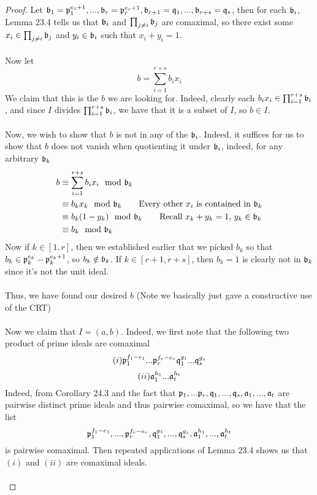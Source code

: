\begin{proof}
Let $\mathfrak{b}_1 = \mathfrak{p}_1^{e_1 + 1}, ..., \mathfrak{b}_r = \mathfrak{p}_r^{e_r + 1}, \mathfrak{b}_{r+1} = \mathfrak{q}_1, ..., \mathfrak{b}_{r+s} = \mathfrak{q}_s$, then for each $\mathfrak{b}_i$, Lemma 23.4 tells us that $\mathfrak{b}_i$ and $\prod_{j \neq i} \mathfrak{b}_j$ are comaximal, so there exist some $x_i \in \prod_{j \neq i} \mathfrak{b}_j$ and $y_i \in \mathfrak{b}_i$ such that $x_i + y_i = 1$.\\\\
Now let
\[b = \sum_{i = 1}^{r+s} b_i x_i \]
We claim that this is the $b$ we are looking for. Indeed, clearly each $b_i x_i \in \prod_{i = 1}^{r + s} \mathfrak{b}_i$, and since $I$ divides $\prod_{i = 1}^{r + s} \mathfrak{b}_i$, we have that it is a subset of $I$, so $b \in I$.\\\\
Now, we wish to show that $b$ is not in any of the $\mathfrak{b}_i$. Indeed, it suffices for us to show that $b$ does not vanish when quotienting it under $\mathfrak{b}_i$, indeed, for any arbitrary $\mathfrak{b}_k$
\begin{align*}
    b &\equiv \sum_{i = 1}^{r+s} b_i x_i \mod \bfrak_k \\
    &\equiv b_k x_k \mod \bfrak_k \tag*{Every other $x_i$ is contained in $\bfrak_k$}\\
    &\equiv b_k(1 - y_k) \mod \bfrak_k \tag*{Recall $x_k + y_k = 1$, $y_k \in \bfrak_k$}\\
    &\equiv b_k \mod \bfrak_k
\end{align*}
Now if $k \in [1, r]$, then we established earlier that we picked $b_k$ so that $b_k \in \mathfrak{p}_k^{e_k} - \mathfrak{p}_k^{e_k + 1}$, so $b_k \notin \mathfrak{b}_k$. If $k \in [r + 1, r + s]$, then $b_k = 1$ is clearly not in $\mathfrak{b}_k$ since it's not the unit ideal.\\\\
Thus, we have found our desired $b$ (Note we basically just gave a constructive use of the CRT)\\\\
Now we claim that $I = (a, b)$. Indeed, we first note that the following two product of prime ideals are comaximal
\[(i) \mathfrak{p}_1^{f_1 - e_1} ... \mathfrak{p}_r^{f_r - e_r} \mathfrak{q}_1^{g_1} ... \mathfrak{q}_s^{g_s}\]
\[(ii) \mathfrak{a}_1^{h_1} ... \mathfrak{a}_t^{h_t}\]
Indeed, from Corollary 24.3 and the fact that $\mathfrak{p}_1, ... \mathfrak{p}_r, \mathfrak{q}_1, ..., \mathfrak{q}_s, \mathfrak{a}_1, ..., \mathfrak{a}_t$ are pairwise distinct prime ideals and thus pairwise comaximal, so we have that the list
\[\mathfrak{p}_1^{f_1 - e_1}, ..., \mathfrak{p}_r^{f_r - e_r}, \mathfrak{q}_1^{g_1}, ..., \mathfrak{q}_s^{g_s}, \mathfrak{a}_1^{h_1}, ..., \mathfrak{a}_t^{h_t}\]
is pairwise comaximal. Then repeated applications of Lemma 23.4 shows us that $(i)$ and $(ii)$ are comaximal ideals.\\\\

\end{proof}
